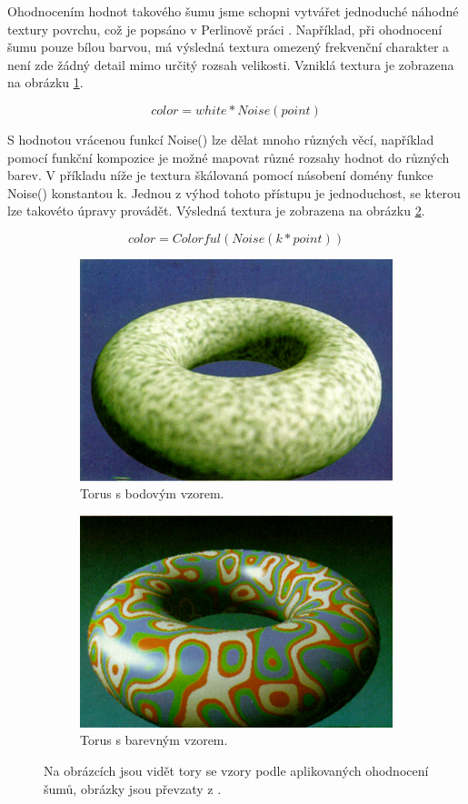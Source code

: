 Ohodnocením hodnot takového šumu jsme schopni vytvářet jednoduché náhodné textury povrchu, což je popsáno v Perlinově práci \cite{PerlinKen}. Například, při ohodnocení šumu pouze bílou barvou, má výsledná textura omezený frekvenční charakter a není zde žádný detail mimo určitý rozsah velikosti. Vzniklá textura je zobrazena na obrázku \ref{SpottedDoughnut}.

\[color = white * Noise(point)\]

S hodnotou vrácenou funkcí Noise() \cite{Perlin2002} lze dělat mnoho různých věcí, například pomocí funkční kompozice je možné mapovat různé rozsahy hodnot do různých barev. V příkladu níže je textura škálovaná pomocí násobení domény funkce Noise() konstantou k. Jednou z výhod tohoto přístupu je jednoduchost, se kterou lze takovéto úpravy provádět. Výsledná textura je zobrazena na obrázku \ref{ColoredDoughnut}.

\[color = Colorful(Noise(k * point))\]

\begin{figure}[H]
	\centering
	\begin{subfigure}{0.5\textwidth}
		\centering
		\includegraphics[scale=0.475]{obrazky-figures/SpottedDoughnut.png}
		\caption{Torus s bodovým vzorem.}
		\label{SpottedDoughnut}
	\end{subfigure}
	\begin{subfigure}{0.4\textwidth}
		\centering
		\includegraphics[scale=0.5]{obrazky-figures/ColoredDoughnut.png}
		\caption{Torus s barevným vzorem.}
		\label{ColoredDoughnut}
	\end{subfigure}
	\caption{Na obrázcích jsou vidět tory se vzory podle aplikovaných ohodnocení šumů, obrázky jsou převzaty z \cite{PerlinKen}.}
	\label{Doughnuts}
\end{figure}

